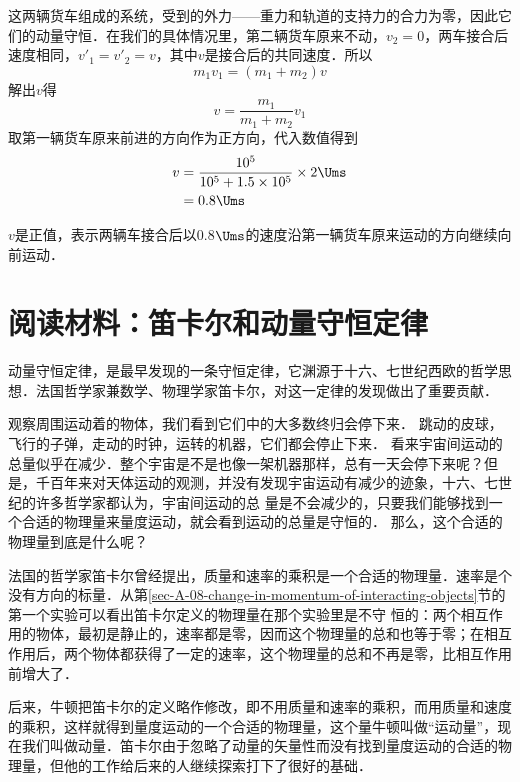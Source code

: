 \begin{solution}
    这两辆货车组成的系统，受到的外力——重力和轨道的支持力的合力为零，因此它们的动量守恒．在我们的具体情况里，第二辆货车原来不动，$v_2=0$，两车接合后速度相同，$v'_1=v'_2=v$，其中$v$是接合后的共同速度．所以
\[m_1v_1=(m_1+m_2)v \]
解出$v$得
\[v=\frac{m_1}{m_1+m_2}v_1\]
取第一辆货车原来前进的方向作为正方向，代入数值得到
\[\begin{split}
    v&=\frac{10^5}{10^5+1.5\times 10^5}\times 2\Ums\\
    &=0.8\Ums
\end{split}\]
\end{solution}
$v$是正值，表示两辆车接合后以0.8$\Ums$的速度沿第一辆货车原来运动的方向继续向前运动．


\section*{阅读材料：笛卡尔和动量守恒定律}
动量守恒定律，是最早发现的一条守恒定律，它渊源于十六、七世纪西欧的哲学思想．法国哲学家兼数学、物理学家笛卡尔，对这一定律的发现做出了重要贡献．

观察周围运动着的物体，我们看到它们中的大多数终归会停下来．
跳动的皮球，飞行的子弹，走动的时钟，运转的机器，它们都会停止下来．
看来宇宙间运动的总量似乎在减少．整个宇宙是不是也像一架机器那样，总有一天会停下来呢？但是，千百年来对天体运动的观测，并没有发现宇宙运动有减少的迹象，十六、七世纪的许多哲学家都认为，宇宙间运动的总
量是不会减少的，只要我们能够找到一个合适的物理量来量度运动，就会看到运动的总量是守恒的．
那么，这个合适的物理量到底是什么呢？

法国的哲学家笛卡尔曾经提出，质量和速率的乘积是一个合适的物理量．速率是个没有方向的标量．从第\ref{sec-A-08-change-in-momentum-of-interacting-objects}节的第一个实验可以看出笛卡尔定义的物理量在那个实验里是不守
恒的：两个相互作用的物体，最初是静止的，速率都是零，因而这个物理量的总和也等于零；在相互作用后，两个物体都获得了一定的速率，这个物理量的总和不再是零，比相互作用前增大了．

后来，牛顿把笛卡尔的定义略作修改，即不用质量和速率的乘积，而用质量和速度的乘积，这样就得到量度运动的一个合适的物理量，这个量牛顿叫做“运动量”，现在我们叫做动量．笛卡尔由于忽略了动量的矢量性而没有找到量度运动的合适的物理量，但他的工作给后来的人继续探索打下了很好的基础．


